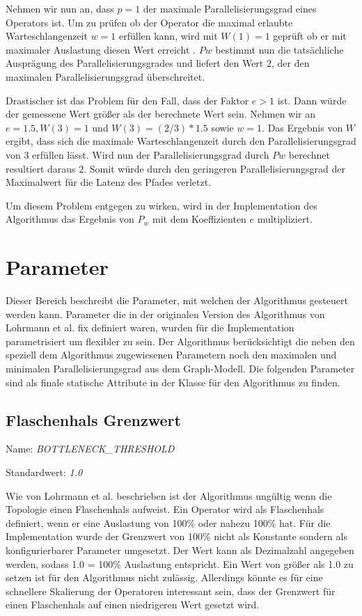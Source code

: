 Nehmen wir nun an, dass \(p=1\) der maximale Parallelisierungsgrad eines Operators ist.
Um zu prüfen ob der Operator die maximal erlaubte Warteschlangenzeit \(w=1\) erfüllen kann, wird mit \(W(1) = 1\) geprüft ob er mit maximaler Auslastung diesen Wert erreicht . 
\(Pw\) bestimmt nun die tatsächliche Ausprägung des Parallelisierungsgrades und liefert den Wert \(2\), der den maximalen Parallelisierungsgrad überschreitet.

Drastischer ist das Problem für den Fall, dass der Faktor \(e > 1\) ist. 
Dann würde der gemessene Wert größer als der berechnete Wert sein. 
Nehmen wir an \(e = 1.5, W(3)=1\) und \(W(3) = (2/3) * 1.5\) sowie \(w=1\). 
Das Ergebnis von \(W\) ergibt, dass sich die maximale Warteschlangenzeit durch den Parallelisierungsgrad von 3 erfüllen lässt. 
Wird nun der Parallelisierungsgrad durch \(Pw\) berechnet resultiert daraus \(2\). 
Somit würde durch den geringeren Parallelisierungsgrad der Maximalwert für die Latenz des Pfades verletzt.

Um diesem Problem entgegen zu wirken, wird in der Implementation des Algorithmus das Ergebnis von \(P_w\) mit dem Koeffizienten \(e\) multipliziert.

\section{Parameter}

Dieser Bereich beschreibt die Parameter, mit welchen der Algorithmus gesteuert werden kann.
Parameter die in der originalen Version des Algorithmus von Lohrmann et al. fix definiert waren, wurden für die Implementation parametrisiert um flexibler zu sein.
Der Algorithmus berücksichtigt die neben den speziell dem Algorithmus zugewiesenen Parametern noch den maximalen und minimalen Parallelisierungsgrad aus dem Graph-Modell.
Die folgenden Parameter sind als finale statische Attribute in der Klasse für den Algorithmus zu finden.

\subsection{Flaschenhals Grenzwert}

Name: \textit{BOTTLENECK\_THRESHOLD}

Standardwert: \textit{1.0}

Wie von Lohrmann et al. beschrieben ist der Algorithmus ungültig wenn die Topologie einen Flaschenhals aufweist.
Ein Operator wird als Flaschenhals definiert, wenn er eine Auslastung von 100\% oder nahezu 100\% hat.
Für die Implementation wurde der Grenzwert von 100\% nicht als Konstante sondern als konfigurierbarer Parameter umgesetzt.
Der Wert kann als Dezimalzahl angegeben werden, sodass 1.0 = 100\% Auslastung entspricht.
Ein Wert von größer als 1.0 zu setzen ist für den Algorithmus nicht zulässig.
Allerdings könnte es für eine schnellere Skalierung der Operatoren interessant sein, dass der Grenzwert für einen Flaschenhals auf einen niedrigeren Wert gesetzt wird.

